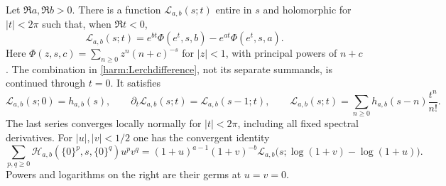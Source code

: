 \begin{theorem}
\label{harm:Lerch}
Let $\Re a,\Re b>0$. There is a function
$\mathcal L_{a,b}(s;t)$ entire in $s$ and holomorphic for $|t|<2\pi$
such that, when $\Re t<0$,
\begin{equation}
 \mathcal L_{a,b}(s;t)=
    e^{bt}\Phi(e^t,s,b)-e^{at}\Phi(e^t,s,a).
 \label{harm:Lerchdifference}
\end{equation}
Here $\Phi(z,s,c)=\sum_{n\ge0}z^n(n+c)^{-s}$ for $|z|<1$, with
principal powers of $n+c$. The combination in
\eqref{harm:Lerchdifference}, not its separate summands, is continued
through $t=0$. It satisfies
\begin{equation}
 \mathcal L_{a,b}(s;0)=h_{a,b}(s),\qquad
 \partial_t\mathcal L_{a,b}(s;t)=\mathcal L_{a,b}(s-1;t),\qquad
 \mathcal L_{a,b}(s;t)=\sum_{n\ge0}h_{a,b}(s-n)\frac{t^n}{n!}.
 \label{harm:LerchTaylor}
\end{equation}
The last series converges locally normally for $|t|<2\pi$, including
all fixed spectral derivatives. For $|u|,|v|<1/2$ one has the convergent
identity
\begin{equation}
 \boxed{\displaystyle
 \sum_{p,q\ge0}\mathcal H_{a,b}(\{0\}^p,s,\{0\}^q)u^pv^q
  =(1+u)^{a-1}(1+v)^{-b}
    \mathcal L_{a,b}\bigl(s;\log(1+v)-\log(1+u)\bigr).}
 \label{harm:zerogenerator}
\end{equation}
Powers and logarithms on the right are their germs at $u=v=0$.
\end{theorem}

